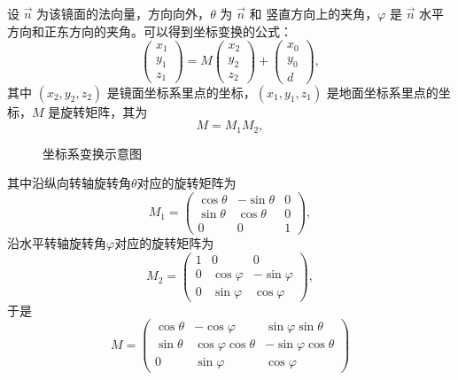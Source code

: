 \documentclass[../main.tex]{subfiles}
\begin{document}
设 \(\vec n\) 为该镜面的法向量，方向向外，\(\theta\) 为 \(\vec n\) 和 竖直方向上的夹角，\(\varphi\) 是 \(\vec n\) 水平方向和正东方向的夹角。可以得到坐标变换的公式：
\begin{equation}
\begin{pmatrix}
x_{1}\\
y_1\\
z_1
\end{pmatrix}
= M
\begin{pmatrix}
x_2\\
y_2\\
z_2
\end{pmatrix} +
\begin{pmatrix}
x_0\\
y_0\\
d
\end{pmatrix},
\end{equation}
其中 \((x_2,y_2,z_2)\) 是镜面坐标系里点的坐标，\((x_1,y_1,z_1)\) 是地面坐标系里点的坐标，\(M\) 是旋转矩阵，其为
\[
M  = M_1 M_2,
\]
\begin{figure}
\centering

\caption{\kaishu 坐标系变换示意图}
\end{figure}
其中沿纵向转轴旋转角$\theta$对应的旋转矩阵为
\[M_1 = 
\begin{pmatrix}
\cos\theta & -\sin \theta & 0\\
\sin\theta& \cos\theta & 0\\
0&0&1
\end{pmatrix},
\]
沿水平转轴旋转角$\varphi$对应的旋转矩阵为
\[M_2 = 
\begin{pmatrix}
1 & 0 & 0\\
0&\cos\varphi & -\sin\varphi\\
0&\sin\varphi&\cos\varphi
\end{pmatrix},
\]
于是
\begin{equation}\label{equ:transM}
M =
\begin{pmatrix}
\cos \theta & - \cos \varphi & \sin \varphi \sin \theta\\
\sin \theta & \cos \varphi \cos \theta & - \sin \varphi \cos \theta\\
0 & \sin \varphi & \cos \varphi
\end{pmatrix}
\end{equation}
\end{document}
